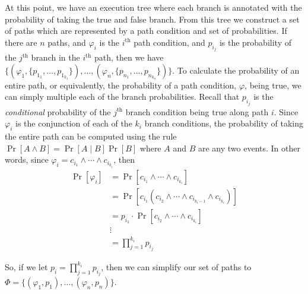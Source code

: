 \documentclass[acmsmall,review]{acmart}\settopmatter{}
\begin{document}
	At this point, we have an execution tree where each branch is annotated with the probability of taking the true and false branch.
	From this tree we construct a set of paths which are represented by a path condition and set of probabilities.
	If there are $n$ paths, and $\varphi_i$ is the $i^\text{th}$ path condition, and $p_{i_j}$ is the probability of the $j^{\text{th}}$ branch in the $i^{\text{th}}$ path, then we have $\{ (\varphi_1, \{p_{1_1},\ldots,p_{1_{k_1}}\}), \ldots, (\varphi_n, \{p_{n_1},\ldots,p_{n_{k_n}}\})\}$.
	To calculate the probability of an entire path, or equivalently, the probability of a path condition, $\varphi$, being true, we can simply multiple each of the branch probabilities.
	Recall that $p_{i_j}$ is the \textit{conditional} probability of the $j^{\text{th}}$ branch condition being true along path $i$.
	Since $\varphi_i$ is the conjunction of each of the $k_i$ branch conditions, the probability of taking the entire path can be computed using the rule $\Pr[A \wedge B] = \Pr[A \mid B]\Pr[B]$ where $A$ and $B$ are any two events.
	In other words, since $\varphi_i = c_{i_1} \wedge \cdots \wedge c_{i_{k_i}}$, then
	\begin{align*}
		\Pr[\varphi_i] &= \Pr[c_{i_1} \wedge \cdots \wedge c_{i_{k_i}}]\\
		&= \Pr[c_{i_1} (c_{i_2} \wedge \cdots \wedge c_{i_{{k_i}-1}} \wedge c_{i_{k_i}})]\\
		&= p_{i_1} \cdot \Pr[c_{i_2} \wedge \cdots \wedge c_{i_{k_i}}]\\
		&\vdots\\
		&= \displaystyle\prod_{j=1}^{k_i} p_{i_j}
	\end{align*}
	
	So, if we let $p_i = \prod_{j=1}^{k_i} p_{i_j}$, then we can simplify our set of paths to $\Phi = \{ (\varphi_1, p_1), \ldots, (\varphi_n, p_n)\}$.
	
\end{document}
